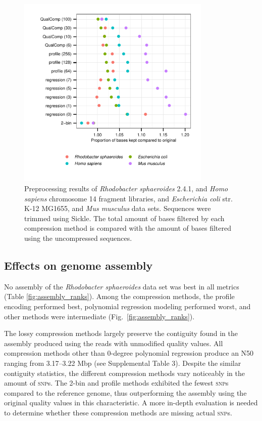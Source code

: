 \documentclass{bioinfo}
\begin{document}
\begin{figure}[!tbp]
\centerline{\includegraphics[width=3.65in]{preprocessing_results.pdf}}
\caption{Preprocessing results of \textit{Rhodobacter sphaeroides}
  2.4.1, and \textit{Homo sapiens} chromosome 14 fragment libraries,
  and \textit{Escherichia coli} str. K-12 MG1655, and \textit{Mus
    musculus} data sets. Sequences were trimmed using Sickle. The
  total amount of bases filtered by each compression method is
  compared with the amount of bases filtered using the uncompressed
  sequences.}
  \label{fig:preprocessing}
\end{figure}

\subsection{Effects on genome assembly}

No assembly of the \textit{Rhodobacter sphaeroides} data set was best
in all metrics (Table \ref{fig:assembly_ranks}). Among the compression
methods, the profile encoding performed best, polynomial regression
modeling performed worst, and other methods were intermediate
(Fig.~\ref{fig:assembly_ranks}).

The lossy compression methods largely preserve the contiguity found in
the assembly produced using the reads with unmodified quality
values. All compression methods other than 0-degree polynomial
regression produce an N50 ranging from 3.17--3.22 Mbp (see
Supplemental Table 3). Despite the similar contiguity statistics, the
different compression methods vary noticeably in the amount of
\textsc{snp}s. The 2-bin and profile methods exhibited the fewest
\textsc{snp}s compared to the reference genome, thus outperforming the
assembly using the original quality values in this characteristic. A
more in-depth evaluation is needed to determine whether these
compression methods are missing actual \textsc{snp}s.
\end{document}
